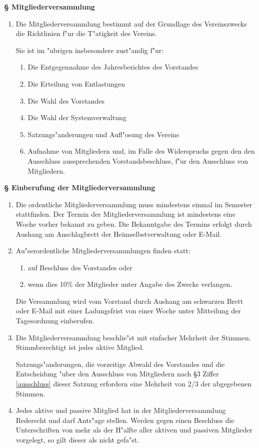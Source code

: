 \documentclass[12pt,titlepage,twoside]{scrartcl}
\newcounter{para_nr}
\newcommand{\Paragraph}[1]{{\large\bf\S{}\sf\textbf{\/\stepcounter{para_nr}\arabic{para_nr} #1}}}
\begin{document}
\begin{appendix}
\Paragraph{Mitgliederversammlung}
\begin{enumerate}
\item[]
  \begin{sloppypar}
    Die Mitgliederversammlung bestimmt auf der Grundlage des Vereinszwecks 
    die Richtlinien f"ur die T"atigkeit des Vereins.
  \end{sloppypar}

  Sie ist im "ubrigen insbesondere zust"andig f"ur:
  \begin{enumerate}
  \item Die Entgegennahme des Jahresberichtes des Vorstandes
  \item Die Erteilung von Entlastungen
  \item Die Wahl des Vorstandes
  \item Die Wahl der Systemverwaltung
  \item Satzungs"anderungen und Aufl"osung des Vereins
  \item Aufnahme von Mitgliedern und, im Falle des Widerspruchs gegen den den
    Ausschluss aussprechenden Vorstandsbeschluss, f"ur den Ausschluss von
    Mitgliedern.
\end{enumerate}
\end{enumerate}

\Paragraph{Einberufung der Mitgliederversammlung}
\begin{enumerate}
\item Die ordentliche Mitgliederversammlung muss mindestens einmal im Semester
  stattfinden. Der Termin der Mitgliederversammlung ist mindestens eine Woche
  vorher bekannt zu geben. Die Bekanntgabe des Termins erfolgt durch Aushang
  am Anschlagbrett der Heimselbstverwaltung oder E-Mail.
\item Au"serordentliche Mitgliederversammlungen finden statt:
  \begin{enumerate}
  \item auf Beschluss des Vorstandes oder
  \item wenn dies 10\% der Mitglieder unter Angabe des Zwecks verlangen.
  \end{enumerate}
  Die Versammlung wird vom Vorstand durch Aushang am schwarzen Brett oder
  E-Mail mit einer Ladungsfrist von einer Woche unter Mitteilung der
  Tagesordnung einberufen. 
\item Die Mitgliederversammlung beschlie"st mit einfacher Mehrheit der 
  Stimmen. Stimmberechtigt ist jedes aktive Mitglied.

  Satzungs"anderungen, die vorzeitige Abwahl des Vorstandes und die 
  Entscheidung "uber den Ausschluss von Mitgliedern nach \S{}3
  Ziffer \ref{ausschluss} dieser Satzung erfordern eine Mehrheit von 2/3 der
  abgegebenen Stimmen.
\item Jedes aktive und passive Mitglied hat in der Mitgliederversammlung
  Rederecht und darf Antr"age stellen. Werden gegen einen Beschluss die
  Unterschriften von mehr als der H"alfte aller aktiven und passiven
  Mitglieder vorgelegt, so gilt dieser als nicht gefa"st.
\end{enumerate}


\end{appendix}
\end{document}
